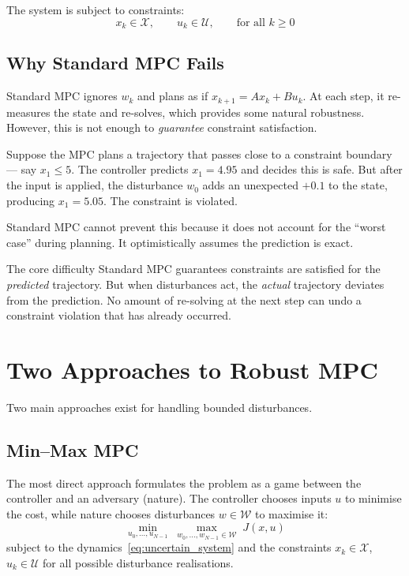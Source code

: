 The system is subject to constraints:
\[
x_k \in \mathcal{X}, \qquad u_k \in \mathcal{U}, \qquad \text{for all } k \ge 0
\]

\subsection*{Why Standard MPC Fails}

Standard MPC ignores $w_k$ and plans as if $x_{k+1} = Ax_k + Bu_k$. At each step, it re-measures the state and re-solves, which provides some natural robustness. However, this is not enough to \emph{guarantee} constraint satisfaction.

Suppose the MPC plans a trajectory that passes close to a constraint boundary --- say $x_1 \le 5$. The controller predicts $x_1 = 4.95$ and decides this is safe. But after the input is applied, the disturbance $w_0$ adds an unexpected $+0.1$ to the state, producing $x_1 = 5.05$. The constraint is violated.

Standard MPC cannot prevent this because it does not account for the ``worst case'' during planning. It optimistically assumes the prediction is exact.

\begin{alertbox}{The core difficulty}
	Standard MPC guarantees constraints are satisfied for the \emph{predicted} trajectory. But when disturbances act, the \emph{actual} trajectory deviates from the prediction. No amount of re-solving at the next step can undo a constraint violation that has already occurred.
\end{alertbox}

\section{Two Approaches to Robust MPC}

Two main approaches exist for handling bounded disturbances.

\subsection{Min--Max MPC}

The most direct approach formulates the problem as a game between the controller and an adversary (nature). The controller chooses inputs $u$ to minimise the cost, while nature chooses disturbances $w \in \mathcal{W}$ to maximise it:
\[
\min_{u_0, \ldots, u_{N-1}} \;\max_{w_0, \ldots, w_{N-1} \in \mathcal{W}} \; J(x, u)
\]
subject to the dynamics~\eqref{eq:uncertain_system} and the constraints $x_k \in \mathcal{X}$, $u_k \in \mathcal{U}$ for all possible disturbance realisations.

